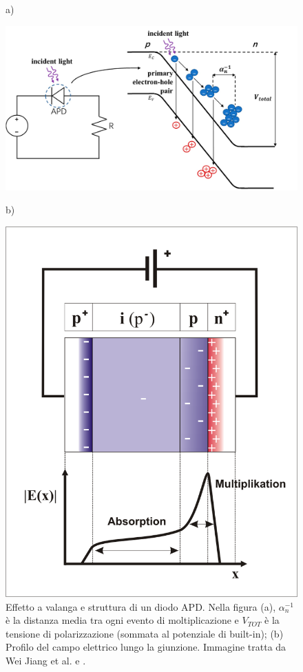 \begin{figure}[tbh]
	\centering
	a)
	\begin{minipage}{.60\textwidth}
		\includegraphics[width=\linewidth]{./ImageFiles/APD.jpg}
	\end{minipage}
	b)
	\begin{minipage}{.30\textwidth}
		\includegraphics[width=\linewidth]{./ImageFiles/APD2_German.png}
	\end{minipage}
	\caption{Effetto a valanga e struttura di un diodo APD. Nella figura (a), $\alpha_n^{-1}$ è la distanza media tra ogni evento di moltiplicazione e $V_{TOT}$ è la tensione di polarizzazione (sommata al potenziale di built-in); (b) Profilo del campo elettrico lungo la giunzione. Immagine tratta da Wei Jiang et al. \cite{Jiang2019} e \cite{ApdImage}.} 
	\label{fig:apd}
\end{figure}
